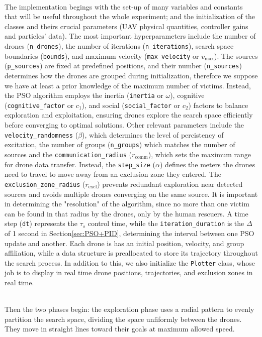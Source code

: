 \noindent\\
The implementation begings with the set-up of 
many variables and constants that will be useful throughout 
the whole experiment; and the initialization of the classes and theirs
crucial parameters (UAV physical quantities, controller gains and 
particles' data).
The most important hyperparameters 
include the number of drones (\texttt{n\_drones}), 
the number of iterations (\texttt{n\_iterations}), 
search space boundaries (\texttt{bounds}), 
and maximum velocity (\texttt{max\_velocity} or $v_\text{max}$). 
The sources (\texttt{p\_sources}) are fixed at predefined positions, 
and their number (\texttt{n\_sources}) determines how the drones are grouped 
during initialization, therefore 
we suppose we have at least a prior knowledge 
of the maximum number of victims. Instead, the PSO algorithm employs 
the inertia (\texttt{inertia} or $\omega$), cognitive (\texttt{cognitive\_factor} or $c_1$), 
and social (\texttt{social\_factor} or $c_2$) factors to 
balance exploration and exploitation, 
ensuring drones explore the search space efficiently
before converging to optimal solutions.
Other relevant parameters include the \texttt{velocity\_randomness} ($\beta$), 
which determines the level of percistency of excitation, the number of groups 
(\texttt{n\_groups}) which matches the number of sources and
the \texttt{communication\_radius} ($r_\text{comm}$), which sets the maximum range for drone 
data transfer.
Instead, the \texttt{step\_size} ($\alpha$) defines the meters the drones need to 
travel to move away from an exclusion zone they entered. 
The \texttt{exclusion\_zone\_radius} ($r_\text{excl}$) prevents redundant 
exploration near detected sources and avoids multiple drones 
converging on the same source. It is important in determining
the "resolution" of the algorithm, since no more than one victim can be found in that
radius by the drones, only by the human rescuers. 
A time step (\texttt{dt}) represents 
the $\tau_s$ control time, while the \texttt{iteration\_duration} 
is the $\Delta$ of 1 second in Section\ref{sec:PSO+PID}, determining the interval between one PSO 
update and another.
Each drone is has an initial position, velocity, and group affiliation, 
while a data structure is preallocated to store its trajectory 
throughout the search process.
In addition to this, we also initialize the \texttt{Plotter} class, 
whose job is to display in real time drone positions, trajectories, 
and exclusion zones in real time.

\noindent\\
Then the two phases begin:
the exploration phase uses a radial pattern to evenly partition 
the search space, dividing the space unfiformly 
between the drones. 
They move in straight lines toward their goals at maximum 
allowed speed. 

